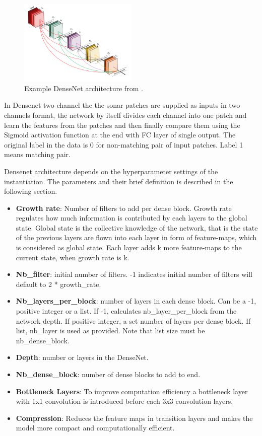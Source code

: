 \begin{figure}[ht]
\centering
\includegraphics[width=0.5\textwidth]{images/densenet/densenet.png}
\caption{Example DenseNet architecture from \cite{densenet}.}
\label{fig:densenet}
\end{figure}

In Densenet two channel the the sonar patches are supplied as inputs in two channels format, the network by itself divides each channel into one patch and learn the features from the patches and then finally compare them using the Sigmoid 
activation function at the end with FC layer of single output. The original label in the data is 0 for non-matching pair of input patches. Label 1 means matching pair.

Densenet architecture depends on the hyperparameter settings of the instantiation. The parameters and their brief definition is described in the following section. 
\begin{itemize}
  \item \textbf{Growth rate}: Number of filters to add per dense block. Growth rate regulates how much information is contributed by each layers to the global state. 
  Global state is the collective knowledge of the network, that is the state of the previous layers are flown into each layer in form of feature-maps, 
  which is considered as global state. Each layer adds k more feature-maps to the current state, when growth rate is k.

  \item \textbf{Nb\_filter}: initial number of filters. -1 indicates initial number of filters will default to 2 * growth\_rate.

  \item \textbf{Nb\_layers\_per\_block}: number of layers in each dense block. Can be a -1, positive integer or a list. If -1, calculates nb\_layer\_per\_block from the network depth. 
  If positive integer, a set number of layers per dense block. If list, nb\_layer is used as provided. Note that list size must be nb\_dense\_block.

  \item \textbf{Depth}: number or layers in the DenseNet.

  \item \textbf{Nb\_dense\_block}: number of dense blocks to add to end.

  \item \textbf{Bottleneck Layers}: To improve computation efficiency a bottleneck layer with 1x1 convolution is introduced before each 3x3 convolution layers. 
  \item \textbf{Compression}: Reduces the feature maps in transition layers and makes the model more compact and computationally efficient.
\end{itemize}

